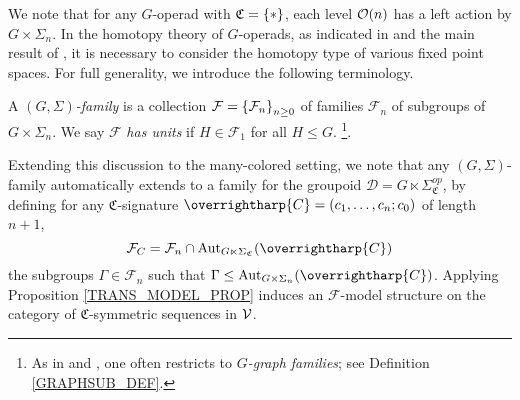 \documentclass[a4paper,10pt
,draft
]{article}%
\renewcommand{\F}{\mathcal F}
\renewcommand{\1}{\eta}%
\newcommand{\vect}[1]{\text{\overrightharp{\ensuremath{#1}}}}
\begin{document}
We note that for any $G$-operad with $\mathfrak C = \set{\**}$, each level $\mathcal{O}(n)$ has a left action by $G \times \Sigma_n$.
In the homotopy theory of $G$-operads, as indicated in \cite{BH15} and the main result of \cite{BP_geo}, it is
necessary to consider the homotopy type of various fixed point spaces.
For full generality, we introduce the following terminology.

\begin{definition}
      \label{GSFAM_DEF}
      A \textit{$(G, \Sigma)$-family} is a collection $\F = \set{\F_n}_{n \geq 0}$ of families $\F_n$ of subgroups of $G \times \Sigma_n$.
      We say $\F$ \textit{has units} if $H \in \F_1$ for all $H \leq G$. \footnote{
        As in \cite{BP_geo} and \cite{BH15}, one often restricts to \textit{$G$-graph families}; see Definition \ref{GRAPHSUB_DEF}.}. %
      
\end{definition}

  
        

Extending this discussion to the many-colored setting, we note that
any $(G, \Sigma)$-family automatically extends to a family for the groupoid $\mathcal D = G \ltimes \Sigma_{\mathfrak C}^{op}$,
by defining for any $\mathfrak C$-signature $\vect C = (c_1,\dots,c_n;c_0)$ of length $n+1$,
\begin{equation}
      \label{FAMC_DEF_EQ}
      \F_C = \F_n \cap \Aut_{G \ltimes \Sigma_{\mathfrak C}}(\vect C)
\end{equation}
the subgroups $\Gamma \in \F_n$ such that $\Gamma \leq \Aut_{G \times \Sigma_n}(\vect C)$.
Applying Proposition \ref{TRANS_MODEL_PROP} induces an $\F$-model structure on the category of $\mathfrak C$-symmetric sequences in $\mathcal V$.
\end{document}

